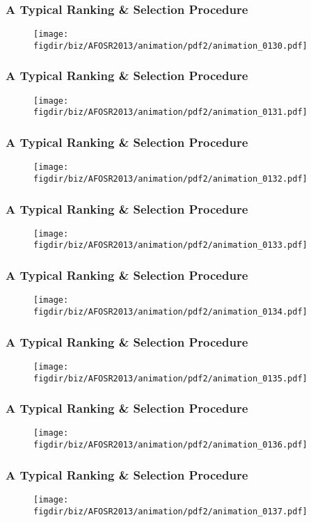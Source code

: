\documentclass[13pt]{beamer}
\newcommand{\figdir}{../../fig}
\begin{document}
\begin{frame}\frametitle{A Typical Ranking \& Selection Procedure}\begin{figure}\texttt{[image: \\figdir/biz/AFOSR2013/animation/pdf2/animation\_0130.pdf]}\end{figure}\end{frame}
\begin{frame}\frametitle{A Typical Ranking \& Selection Procedure}\begin{figure}\texttt{[image: \\figdir/biz/AFOSR2013/animation/pdf2/animation\_0131.pdf]}\end{figure}\end{frame}
\begin{frame}\frametitle{A Typical Ranking \& Selection Procedure}\begin{figure}\texttt{[image: \\figdir/biz/AFOSR2013/animation/pdf2/animation\_0132.pdf]}\end{figure}\end{frame}
\begin{frame}\frametitle{A Typical Ranking \& Selection Procedure}\begin{figure}\texttt{[image: \\figdir/biz/AFOSR2013/animation/pdf2/animation\_0133.pdf]}\end{figure}\end{frame}
\begin{frame}\frametitle{A Typical Ranking \& Selection Procedure}\begin{figure}\texttt{[image: \\figdir/biz/AFOSR2013/animation/pdf2/animation\_0134.pdf]}\end{figure}\end{frame}
\begin{frame}\frametitle{A Typical Ranking \& Selection Procedure}\begin{figure}\texttt{[image: \\figdir/biz/AFOSR2013/animation/pdf2/animation\_0135.pdf]}\end{figure}\end{frame}
\begin{frame}\frametitle{A Typical Ranking \& Selection Procedure}\begin{figure}\texttt{[image: \\figdir/biz/AFOSR2013/animation/pdf2/animation\_0136.pdf]}\end{figure}\end{frame}
\begin{frame}\frametitle{A Typical Ranking \& Selection Procedure}\begin{figure}\texttt{[image: \\figdir/biz/AFOSR2013/animation/pdf2/animation\_0137.pdf]}\end{figure}\end{frame}
\end{document}
